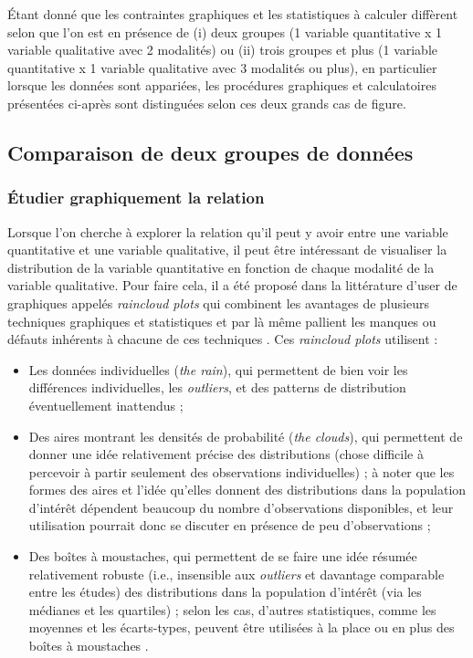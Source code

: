 \documentclass[
  french,
]{book}
\providecommand{\tightlist}{%
  \setlength{\itemsep}{0pt}\setlength{\parskip}{0pt}}
\begin{document}
Étant donné que les contraintes graphiques et les statistiques à calculer diffèrent selon que l'on est en présence de (i) deux groupes (1 variable quantitative x 1 variable qualitative avec 2 modalités) ou (ii) trois groupes et plus (1 variable quantitative x 1 variable qualitative avec 3 modalités ou plus), en particulier lorsque les données sont appariées, les procédures graphiques et calculatoires présentées ci-après sont distinguées selon ces deux grands cas de figure.

\hypertarget{comparaison-de-deux-groupes-de-donnuxe9es}{%
\subsection{Comparaison de deux groupes de données}\label{comparaison-de-deux-groupes-de-donnuxe9es}}

\hypertarget{uxe9tudier-graphiquement-la-relation-2}{%
\subsubsection{Étudier graphiquement la relation}\label{uxe9tudier-graphiquement-la-relation-2}}

Lorsque l'on cherche à explorer la relation qu'il peut y avoir entre une variable quantitative et une variable qualitative, il peut être intéressant de visualiser la distribution de la variable quantitative en fonction de chaque modalité de la variable qualitative. Pour faire cela, il a été proposé dans la littérature d'user de graphiques appelés \emph{raincloud plots} qui combinent les avantages de plusieurs techniques graphiques et statistiques et par là même pallient les manques ou défauts inhérents à chacune de ces techniques \autocite{allenRaincloudPlotsMultiplatform2019}. Ces \emph{raincloud plots} utilisent :

\begin{itemize}
\tightlist
\item
  Les données individuelles (\emph{the rain}), qui permettent de bien voir les différences individuelles, les \emph{outliers}, et des patterns de distribution éventuellement inattendus ;
\item
  Des aires montrant les densités de probabilité (\emph{the clouds}), qui permettent de donner une idée relativement précise des distributions (chose difficile à percevoir à partir seulement des observations individuelles) ; à noter que les formes des aires et l'idée qu'elles donnent des distributions dans la population d'intérêt dépendent beaucoup du nombre d'observations disponibles, et leur utilisation pourrait donc se discuter en présence de peu d'observations ;
\item
  Des boîtes à moustaches, qui permettent de se faire une idée résumée relativement robuste (i.e., insensible aux \emph{outliers} et davantage comparable entre les études) des distributions dans la population d'intérêt (via les médianes et les quartiles) ; selon les cas, d'autres statistiques, comme les moyennes et les écarts-types, peuvent être utilisées à la place ou en plus des boîtes à moustaches \autocite{allenRaincloudPlotsMultiplatform2019}.
\end{itemize}
\end{document}
